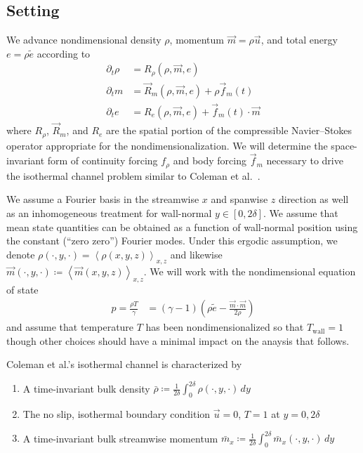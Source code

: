 \documentclass[letterpaper,11pt,nointlimits,reqno]{amsart}
\begin{document}
\subsection*{Setting}

We advance nondimensional density $\rho$, momentum $\vec{m}=\rho{}\vec{u}$, and
total energy $e = \rho{}\tilde{e}$ according to
\begin{subequations}
\begin{align}
  \partial_{t} \rho{} &= R_{\rho}\!\left(\rho,\vec{m},e\right)
  \\
  \partial_{t} m      &= \vec{R}_{m}\!\left(\rho,\vec{m},e\right)
                       + \rho \vec{f}_{m}(t)
  \\
  \partial_{t} e      &= R_{e}\!\left(\rho,\vec{m},e\right)
                       + \vec{f}_{m}(t) \cdot \vec{m}
\end{align}
\end{subequations}
where $R_{\rho}$, $\vec{R}_{m}$, and $R_{e}$ are the spatial portion of the
compressible Navier--Stokes operator appropriate for the nondimensionalization.
We will determine the space-invariant form of continuity forcing $f_{\rho}$ and
body forcing $\vec{f}_{m}$ necessary to drive the isothermal channel problem
similar to Coleman et al.~\cite{Coleman1995Numerical}.

We assume a Fourier basis in the streamwise $x$ and spanwise $z$ direction as
well as an inhomogeneous treatment for wall-normal
$y\in\left[0,2\delta\right]$.  We assume that mean state quantities can be
obtained as a function of wall-normal position using the constant (``zero
zero'') Fourier modes.  Under this ergodic assumption, we denote
$\rho\!\left(\cdot,y,\cdot\right) =
\left<\rho\left(x,y,z\right)\right>_{x,z}$ and likewise
$\vec{m}\!\left(\cdot,y,\cdot\right) \coloneqq
\left<\vec{m}\left(x,y,z\right)\right>_{x,z}$.  We will work with the
nondimensional equation of state
\begin{align}
  p  = \frac{\rho{}T}{\gamma}
    &= \left(\gamma-1\right)
       \left( \rho\tilde{e} - \frac{\vec{m}\cdot\vec{m}}{2\rho} \right)
\end{align}
and assume that temperature $T$ has been nondimensionalized so that
$T_\text{wall}=1$ though other choices should have a minimal impact on
the anaysis that follows.

Coleman et al.'s isothermal channel is characterized by
\begin{enumerate}
  \item A time-invariant bulk density $\bar{\rho} \coloneqq \frac{1}{2\delta}
        \int_{0}^{2\delta} \rho\!\left(\cdot,y,\cdot\right)\,dy $
  \item The no slip, isothermal boundary condition
        $\vec{u}=0$, $T = 1$ at $y = 0,2\delta$
  \item A time-invariant bulk streamwise momentum
        $\bar{m}_{x} \coloneqq \frac{1}{2\delta}
        \int_{0}^{2\delta} \bar{m}_{x}\!\left(\cdot,y,\cdot\right)\,dy $
\end{enumerate}
\end{document}
